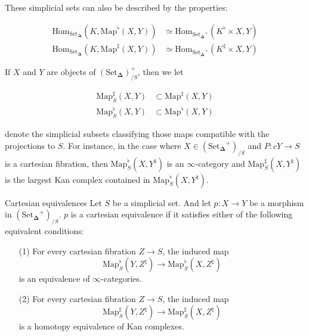 \documentclass{beamer}[9pt]
\newcommand{\8}{\ensuremath{\infty}}
\newcommand{\SSet}{\ensuremath{\text{Set}_{\boldsymbol{\Delta}}}}
\newcommand{\Map}{\ensuremath{\text{Map}}}
\newcommand{\Hom}{\ensuremath{\text{Hom}}}
\begin{document}
\begin{frame}
  These simplicial sets can also be described by the properties:

  \begin{align*}
    \Hom_{\SSet}(K, \Map^\flat(X, Y))  & \simeq \Hom_{\SSet^+}(K^\flat\times X, Y)  \\
    \Hom_{\SSet}(K, \Map^\sharp(X, Y)) & \simeq \Hom_{\SSet^+}(K^\sharp\times X, Y)
  \end{align*}

  \pause

  If $X$ and $Y$ are objects of $(\SSet)^+_{/S}$, then we let

  \begin{align*}
    \Map_S^\sharp(X, Y) & \subset \Map^\sharp(X, Y) \\
    \Map_S^\flat(X, Y)  & \subset \Map^\flat(X, Y)
  \end{align*}

  denote the simplicial subsets classifying those maps compatible with the projections to $S$. For instance, in the case where $X \in (\SSet^+)_{/S}$ and $P: c Y \rightarrow S$ is a cartesian fibration, then $\Map^\flat_S(X, Y^\natural)$ is an \8-category and $\Map^\sharp_S(X, Y^\natural)$ is the largest Kan complex contained in $\Map^\flat_S(X, Y^\natural)$.
\end{frame}

\begin{frame}{Cartesian equivalences}
  Let $S$ be a simplicial set. And let $p: X \rightarrow Y$ be a morphism in $(\SSet^+)_{/S}$. $p$ is a cartesian equivalence if it satisfies either of the following equivalent conditions:

  \begin{itemize}
    \item[(1)] For every cartesian fibration $Z \rightarrow S$, the induced map
          $$
            \Map^\flat_S(Y, Z^\natural) \rightarrow \Map_S^\flat(X, Z^\natural)
          $$
          is an equivalence of \8-categories.
  \end{itemize}
\end{frame}

\begin{frame}
  \begin{itemize}
    \item[(2)] For every cartesian fibration $Z \rightarrow S$, the induced map
          $$
            \Map^\sharp_S(Y, Z^\natural) \rightarrow \Map_S^\sharp(X, Z^\natural)
          $$
          is a homotopy equivalence of Kan complexes.
  \end{itemize}
\end{frame}
\end{document}
